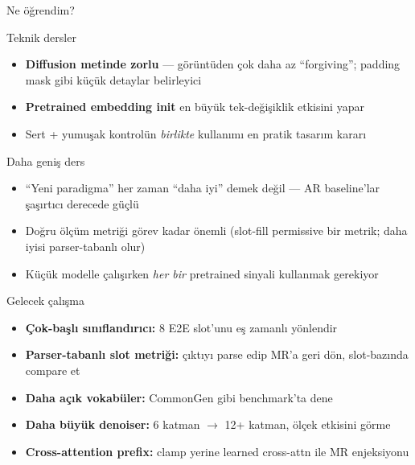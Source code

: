 \documentclass[10pt,aspectratio=169]{beamer}
\begin{document}
\begin{frame}{Ne öğrendim?}
  \begin{block}{Teknik dersler}
    \begin{itemize}
      \item \textbf{Diffusion metinde zorlu} --- görüntüden çok daha az
            ``forgiving''; padding mask gibi küçük detaylar belirleyici
      \item \textbf{Pretrained embedding init} en büyük tek-değişiklik
            etkisini yapar
      \item Sert + yumuşak kontrolün \emph{birlikte} kullanımı en pratik
            tasarım kararı
    \end{itemize}
  \end{block}

  \begin{block}{Daha geniş ders}
    \begin{itemize}
      \item ``Yeni paradigma'' her zaman ``daha iyi'' demek değil ---
            AR baseline'lar şaşırtıcı derecede güçlü
      \item Doğru ölçüm metriği görev kadar önemli (slot-fill permissive bir
            metrik; daha iyisi parser-tabanlı olur)
      \item Küçük modelle çalışırken \emph{her bir} pretrained sinyali
            kullanmak gerekiyor
    \end{itemize}
  \end{block}
\end{frame}

\begin{frame}{Gelecek çalışma}
  \begin{itemize}
    \item \textbf{Çok-başlı sınıflandırıcı:} 8 E2E slot'unu eş zamanlı
          yönlendir
    \item \textbf{Parser-tabanlı slot metriği:} çıktıyı parse edip MR'a geri
          dön, slot-bazında compare et
    \item \textbf{Daha açık vokabüler:} CommonGen gibi benchmark'ta dene
    \item \textbf{Daha büyük denoiser:} 6 katman $\to$ 12+ katman, ölçek
          etkisini görme
    \item \textbf{Cross-attention prefix:} clamp yerine learned cross-attn
          ile MR enjeksiyonu
  \end{itemize}
\end{frame}
\end{document}
